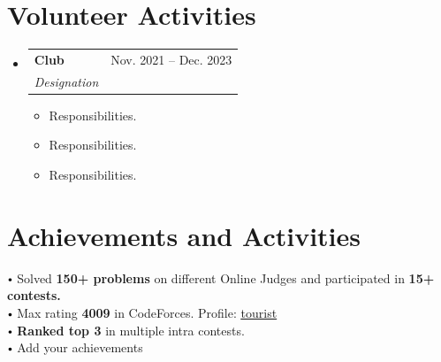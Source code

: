 \documentclass[letterpaper,11pt]{article}
\makeatletter
\newcommand{\resumeItem}[1]{
  \item\small{
    {#1 \vspace{-2pt}}
  }
}
\newcommand{\resumeSubheading}[4]{
  \vspace{-2pt}\item
    \begin{tabular*}{0.97\textwidth}[t]{l@{\extracolsep{\fill}}r}
      \textbf{#1} & #2 \\
      \textit{\small#3} & \textit{\small #4} \\
    \end{tabular*}\vspace{-7pt}
}
\renewcommand\labelitemii{$\vcenter{\hbox{\tiny$\bullet$}}$}
\newcommand{\resumeSubHeadingListStart}{\begin{itemize}[leftmargin=0.15in, label={}]}
\newcommand{\resumeSubHeadingListEnd}{\end{itemize}}
\newcommand{\resumeItemListStart}{\begin{itemize}}
\newcommand{\resumeItemListEnd}{\end{itemize}\vspace{-5pt}}
\makeatother
\begin{document}
\section{Volunteer Activities}
  \resumeSubHeadingListStart

    \resumeSubheading
      {Club}{Nov. 2021 -- Dec. 2023}
      {Designation}{ }
      \resumeItemListStart
        \resumeItem{Responsibilities.}
        \resumeItem{Responsibilities.}
        \resumeItem{Responsibilities.}
      \resumeItemListEnd
  \resumeSubHeadingListEnd
  
\section{Achievements and Activities}
 \begin{itemize}[leftmargin=0.15in, label={}]
    \small{\item{
        \vspace{1mm}
        \labelitemii{ Solved \textbf{150+ problems} on different Online Judges and participated in \textbf{15+ contests.}} \\
        \vspace{1mm}
        \labelitemii{ Max rating \textbf{4009} in CodeForces. Profile: \href{https://codeforces.com/profile/tourist}{{\underline{tourist}}}} \\
        \vspace{1mm}
        \vspace{1mm}
        \labelitemii{ \textbf{Ranked top 3} in multiple intra contests.} \\
        \vspace{1mm}
        \labelitemii{ Add your achievements } \\
    }}
    
 \end{itemize} 
\end{document}
